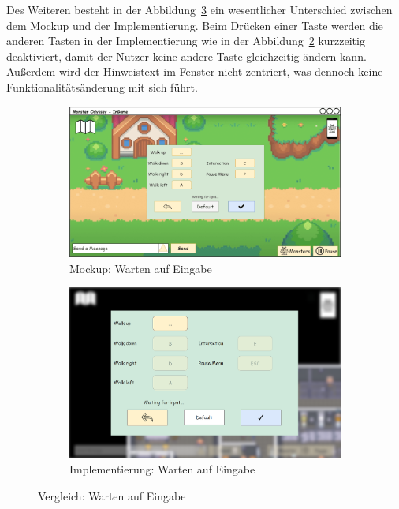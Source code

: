 Des Weiteren besteht in der Abbildung~\ref{fig: Vergleich: Warten auf Eingabe} ein wesentlicher Unterschied zwischen dem Mockup und der Implementierung. Beim Drücken einer Taste werden die anderen Tasten in der Implementierung wie in der Abbildung~\ref{fig: Implementierung: Warten auf Eingabe} kurzzeitig deaktiviert, damit der Nutzer keine andere Taste gleichzeitig ändern kann. Außerdem wird der Hinweistext im Fenster nicht zentriert, was dennoch keine Funktionalitätsänderung mit sich führt.
\begin{figure}[H]
    \centering
    \begin{subfigure}[b]{0.4\textwidth}
        \includegraphics[width=\textwidth]{images/mockups/Bonusfeatures/Keybindings/KeybindingsSettingsWaitingForInput.png}
        \caption{Mockup: \phantom{aaaaaaa} Warten auf Eingabe}
        \label{fig: Mockup: Warten auf Eingabe}
    \end{subfigure}
    \hfill
    \begin{subfigure}[b]{0.4\textwidth}
        \includegraphics[width=\textwidth]{images/implementation/Bonusfeatures/Keybindings/WaitForInput.png}
        \caption{Implementierung: Warten auf Eingabe}
        \label{fig: Implementierung: Warten auf Eingabe}
    \end{subfigure}
    \caption{Vergleich: Warten auf Eingabe}
    \label{fig: Vergleich: Warten auf Eingabe}
\end{figure}
